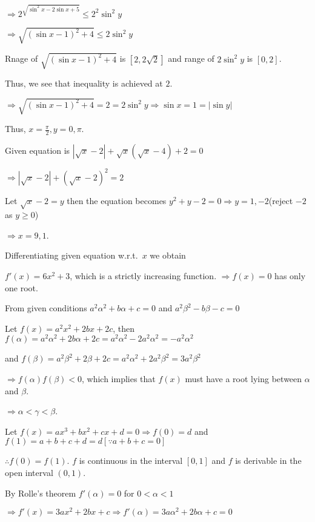   $\Rightarrow 2^{\sqrt{\sin^2x - 2\sin x + 5}}\leq 2^2\sin^2y$

  $\Rightarrow \sqrt{(\sin x - 1)^2 + 4}\leq 2\sin^2y$

  Rnage of $\sqrt{(\sin x - 1)^2 + 4}$ is $\left[2, 2\sqrt{2}\right]$ and range of $2\sin^2y$ is $\left[0,
    2\right]$.

  Thus, we see that inequality is achieved at $2$.

  $\Rightarrow \sqrt{(\sin x - 1)^2 + 4} = 2 = 2\sin^2y \Rightarrow \sin x = 1 = |\sin y|$

  Thus, $x = \frac{\pi}{2}, y = 0, \pi$.
\item Given equation is $\left|\sqrt{x} - 2\right| + \sqrt{x}\left(\sqrt{x} - 4\right) + 2 = 0$

  $\Rightarrow \left|\sqrt{x} - 2\right| + \left(\sqrt{x} - 2\right)^2 = 2$

  Let $\sqrt{x} - 2 = y$ then the equation becomes $y^2 + y - 2 = 0\Rightarrow y = 1, -2$(reject $-2$ as
  $y \geq 0$)

  $\Rightarrow x = 9, 1$.
\item Differentiating given equation w.r.t.\ $x$ we obtain

  $f'(x) = 6x^2 + 3$, which is a strictly increasing function. $\Rightarrow f(x) = 0$ has only one root.
\item From given conditions $a^2\alpha^2 + b\alpha + c = 0$ and $a^2\beta^2 - b\beta - c = 0$

  Let $f(x) = a^2x^2 + 2bx + 2c$, then $f(\alpha) = a^2\alpha^2 + 2b\alpha + 2c = a^2\alpha^2 - 2a^2\alpha^2
  = -a^2\alpha^2$

  and $f(\beta) = a^2\beta^2 + 2\beta + 2c = a^2\alpha^2 + 2a^2\beta^2 = 3a^2\beta^2$

  $\Rightarrow f(\alpha)f(\beta) < 0$, which implies that $f(x)$ must have a root lying between $\alpha$ and
  $\beta$.

  $\Rightarrow \alpha < \gamma <\beta$.
\item Let $f(x) = ax^3 + bx^2 + cx + d = 0\Rightarrow f(0) = d$ and $f(1) = a + b + c + d = d[\because a + b
  + c = 0]$

  $\therefore f(0) = f(1)$. $f$ is continuous in the interval $[0, 1]$ and $f$ is derivable in the open
  interval $(0, 1)$.

  By Rolle's theorem $f'(\alpha) = 0$ for $0 < \alpha < 1$

  $\Rightarrow f'(x) = 3ax^2 + 2bx + c\Rightarrow f'(\alpha) = 3a\alpha^2 + 2b\alpha + c = 0$

